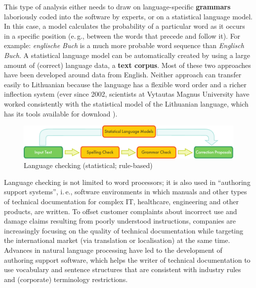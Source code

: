 \begin{multicols}{2}
This type of analysis either needs to draw on language-specific \textbf{grammars} laboriously coded into the software by experts, or on a statistical language model. In this case, a model calculates the probability of a particular word as it occurs in a specific position (e.\,g., between the words that precede and follow it). For example: \textit{englische Buch} is a much more probable word sequence than \textit{Englisch Buch}. A statistical language model can be automatically created by using a large amount of (correct) language data, a \textbf{text corpus}. Most of these two approaches have been developed around data from English. Neither approach can transfer easily to Lithuanian because the language has a flexible word order and a richer inflection system (ever since 2002, scientists at Vytautas Magnus University have worked consistently with the statistical model of the Lithuanian language, which has its tools available for download \cite{airenas}).

\begin{figure}[htb]
  \center
  \includegraphics[width=\textwidth]{../_media/english/language_checking}
  \caption{Language checking (statistical; rule-based)}
  \label{fig:langcheckingaarch_en}
\end{figure}

Language checking is not limited to word processors; it is also used in “authoring support systems”, i.\,e., software environments in which manuals and other types of technical documentation for complex IT, healthcare, engineering and other products, are written. To offset customer complaints about incorrect use and damage claims resulting from poorly understood instructions, companies are increasingly focusing on the quality of technical documentation while targeting the international market (via translation or localisation) at the same time. Advances in natural language processing have led to the development of authoring support software, which helps the writer of technical documentation to use vocabulary and sentence structures that are consistent with industry rules and (corporate) terminology restrictions.



\end{multicols}
